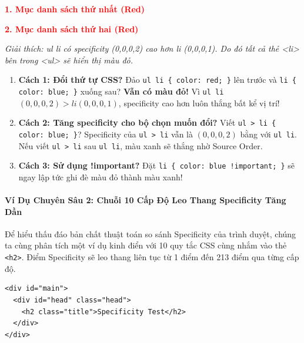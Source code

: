 \documentclass[11pt,oneside]{book}
\newcommand{\codeinline}[1]{\textcolor{accentOrange}{\texttt{#1}}}
\begin{document}
\begin{browserWindow}
\sffamily\small
\textcolor{red}{\textbf{1. Mục danh sách thứ nhất (Red)}} \par
\textcolor{red}{\textbf{2. Mục danh sách thứ hai (Red)}} \par\vspace{4pt}
{\scriptsize\textcolor{gray!60}{\textit{Giải thích: ul li có specificity (0,0,0,2) cao hơn li (0,0,0,1). Do đó tất cả thẻ <li> bên trong <ul> sẽ hiển thị màu đỏ.}}}
\end{browserWindow}

\begin{conceptBox}
\begin{enumerate}[leftmargin=1.5em, itemsep=3pt, parsep=0pt]
    \item \textbf{Cách 1: Đổi thứ tự CSS?} Đảo \codeinline{ul li \{ color: red; \}} lên trước và \codeinline{li \{ color: blue; \}} xuống sau? \textbf{Vẫn có màu đỏ!} Vì \codeinline{ul li} $(0,0,0,2) > li (0,0,0,1)$, specificity cao hơn luôn thắng bất kể vị trí!
    \item \textbf{Cách 2: Tăng specificity cho bộ chọn muốn đổi?} Viết \codeinline{ul > li \{ color: blue; \}}? Specificity của \codeinline{ul > li} vẫn là $(0,0,0,2)$ bằng với \codeinline{ul li}. Nếu viết \codeinline{ul > li} sau \codeinline{ul li}, màu xanh sẽ thắng nhờ Source Order.
    \item \textbf{Cách 3: Sử dụng !important?} Đặt \codeinline{li \{ color: blue !important; \}} sẽ ngay lập tức ghi đè màu đỏ thành màu xanh!
\end{enumerate}
\end{conceptBox}

\paragraph{Ví Dụ Chuyên Sâu 2: Chuỗi 10 Cấp Độ Leo Thang Specificity Tăng Dần}

Để hiểu thấu đáo bản chất thuật toán so sánh Specificity của trình duyệt, chúng ta cùng phân tích một ví dụ kinh điển với 10 quy tắc CSS cùng nhắm vào thẻ \codeinline{<h2>}. Điểm Specificity sẽ leo thang liên tục từ 1 điểm đến 213 điểm qua từng cấp độ.

\begin{codeWindow}
\begin{lstlisting}[language=HTML5]
<div id="main">
  <div id="head" class="head">
    <h2 class="title">Specificity Test</h2>
  </div>
</div>
\end{lstlisting}
\end{codeWindow}
\end{document}
